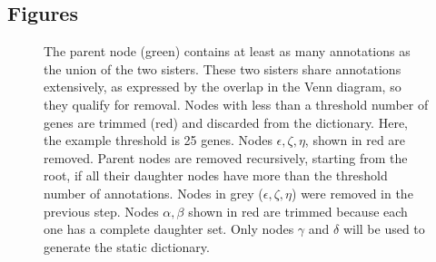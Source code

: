 \documentclass{bmcart}
\begin{document}
\begin{backmatter}


\section*{Figures}

\begin{figure}[htbp]
  \begin{subfigure}[b]{0.3\textwidth}
   	 	\caption{}
    \label{fig:simdiagram}
  \end{subfigure}
  \begin{subfigure}[b]{0.3\textwidth}
	      \caption{}
    \label{fig:trim_ends}
  \end{subfigure}
  \begin{subfigure}[b]{0.3\textwidth}
    	\caption{}
    \label{fig:trim_roots}
  \end{subfigure}

  \captionsetup{width= 0.95\textwidth}
  \caption{
     The parent node (green) contains at least as many annotations as the union of the two sisters. These two sisters share annotations extensively, as expressed by the overlap in the Venn diagram, so they qualify for removal. 	
	 Nodes with less than a threshold number of genes are trimmed (red) and discarded from the dictionary. Here, the example threshold is 25 genes. Nodes $\epsilon, \zeta, \eta$, shown in red are removed.
	 Parent nodes are removed recursively, starting from the root, if all their daughter nodes have more than the threshold number of annotations. Nodes in grey ($\epsilon, \zeta, \eta$) were removed in the previous step. Nodes $\alpha, \beta$ shown in red are trimmed because each one has a complete daughter set. Only nodes $\gamma$ and $\delta$ will be used to generate the static dictionary. 
  }
\end{figure}




\end{backmatter}
\end{document}
